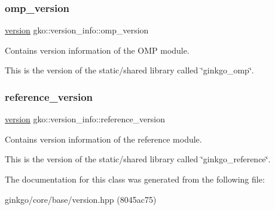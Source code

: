 \subsubsection{\texorpdfstring{omp\+\_\+version}{omp\_version}}
{\footnotesize\ttfamily \hyperlink{structgko_1_1version}{version} gko\+::version\+\_\+info\+::omp\+\_\+version}



Contains version information of the O\+MP module. 

This is the version of the static/shared library called \char`\"{}ginkgo\+\_\+omp\char`\"{}. \mbox{\label{classgko_1_1version__info_a772fcf25f93d719b733602b4bba7d7ec}} 
\subsubsection{\texorpdfstring{reference\+\_\+version}{reference\_version}}
{\footnotesize\ttfamily \hyperlink{structgko_1_1version}{version} gko\+::version\+\_\+info\+::reference\+\_\+version}



Contains version information of the reference module. 

This is the version of the static/shared library called \char`\"{}ginkgo\+\_\+reference\char`\"{}. 

The documentation for this class was generated from the following file\+:\begin{DoxyCompactItemize}
\item 
ginkgo/core/base/version.\+hpp (8045ac75)\end{DoxyCompactItemize}
